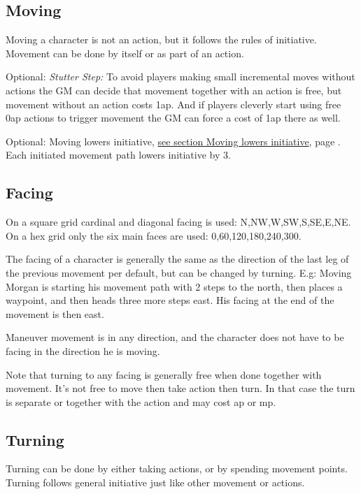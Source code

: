 \subsection*{Moving}
Moving a character is not an action, but it follows the rules of initiative. Movement can be done by itself or as part of an action.

Optional: \emph{Stutter Step:} To avoid players making small incremental moves without actions the GM can decide that movement together with an action is free, but movement without an action costs 1ap. And if players cleverly start using free 0ap actions to trigger movement the GM can force a cost of 1ap there as well.

Optional: Moving lowers initiative, \hyperref[sec:movinglowersinitiative]{see section Moving lowers initiative}, page \pageref{sec:movinglowersinitiative}. Each initiated movement path lowers initiative by 3.


\subsection*{Facing}
On a square grid cardinal and diagonal facing is used: N,NW,W,SW,S,SE,E,NE.
On a hex grid only the six main faces are used: 0,60,120,180,240,300.

The facing of a character is generally the same as the direction of the last leg of the previous movement per default, but can be changed by turning. E.g: Moving Morgan is starting his movement path with 2 steps to the north, then places a waypoint, and then heads three more steps east. His facing at the end of the movement is then east.

Maneuver movement is in any direction, and the character does not have to be facing in the direction he is moving.

Note that turning to any facing is generally free when done together with movement. It's not free to move then take action then turn. In that case the turn is separate or together with the action and may cost ap or mp.


\subsection*{Turning}
Turning can be done by either taking actions, or by spending movement points. Turning follows general initiative just like other movement or actions.

